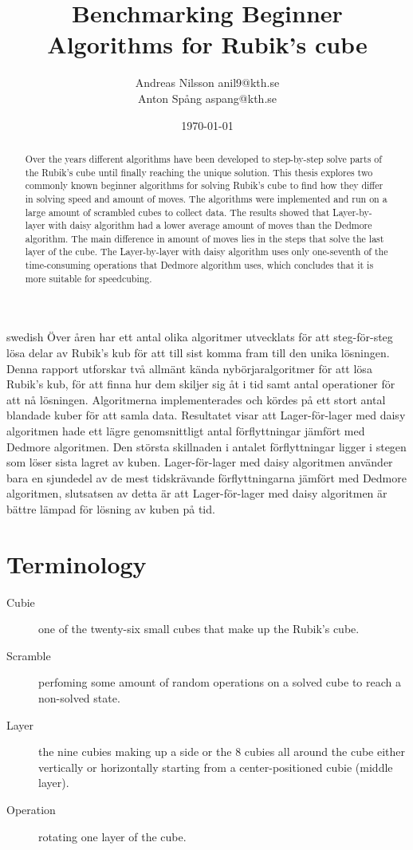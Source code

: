 \documentclass[a4paper,11pt]{kth-mag}
\title{Benchmarking Beginner Algorithms for
           Rubik's cube}
\author{Andreas Nilsson  anil9@kth.se\\Anton Spång  aspang@kth.se}
\date{\today}
\begin{document}
\frontmatter
\pagestyle{empty}
\removepagenumbers
\maketitle
{}
\begin{abstract}
 Over the years different algorithms have been developed to step-by-step solve parts of the Rubik's cube until finally reaching the unique solution. This thesis explores two commonly known beginner algorithms for solving Rubik’s cube to find how they differ in solving speed and amount of moves. The algorithms were implemented and run on a large amount of scrambled cubes to collect data. The results showed that Layer-by-layer with daisy algorithm had a lower average amount of moves than the Dedmore algorithm. The main difference in amount of moves lies in the steps that solve the last layer of the cube. The Layer-by-layer with daisy algorithm uses only one-seventh of the time-consuming operations that Dedmore algorithm uses, which concludes that it is more suitable for speedcubing. 


  


\end{abstract}
\clearpage
\begin{foreignabstract}{swedish}
  Över åren har ett antal olika algoritmer utvecklats för att steg-för-steg lösa delar av Rubik's kub för att till sist komma fram till den unika lösningen. Denna rapport utforskar två allmänt kända nybörjaralgoritmer för att lösa Rubik's kub, för att finna hur dem skiljer sig åt i tid samt antal operationer för att nå lösningen. Algoritmerna implementerades och kördes på ett stort antal blandade kuber för att samla data. Resultatet visar att Lager-för-lager med daisy algoritmen hade ett lägre genomsnittligt antal förflyttningar jämfört med Dedmore algoritmen. Den största skillnaden i antalet förflyttningar ligger i stegen som löser sista lagret av kuben. Lager-för-lager med daisy algoritmen använder bara en sjundedel av de mest tidskrävande förflyttningarna jämfört med Dedmore algoritmen, slutsatsen av detta är att Lager-för-lager med daisy algoritmen är bättre lämpad för lösning av kuben på tid.  
\end{foreignabstract}

\clearpage
\tableofcontents*
\mainmatter
\section{Terminology} 
	\begin{description}
		\item[Cubie] one of the twenty-six small cubes that make up the Rubik's cube.
		\item[Scramble] perfoming some amount of random operations on a solved cube to reach a non-solved state.
		\item[Layer] the nine cubies making up a side or the 8 cubies all around the cube either vertically or horizontally starting from a center-positioned cubie (middle layer).
		\item[Operation] rotating one layer of the cube.
	\end{description}
\end{document}

